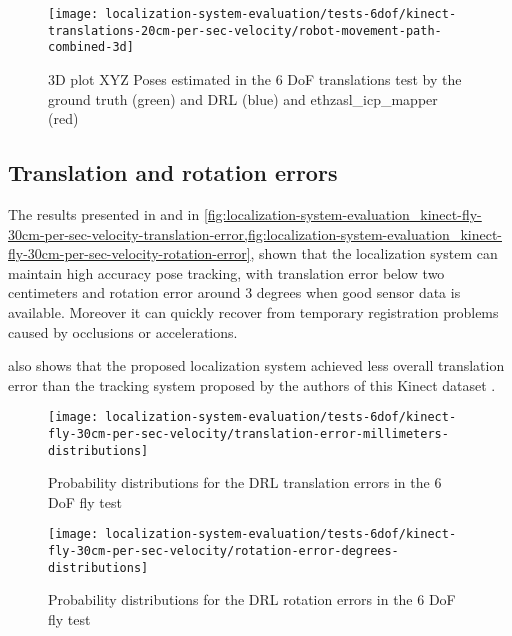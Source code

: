\begin{figure}[H]
	\centering
	\texttt{[image: localization-system-evaluation/tests-6dof/kinect-translations-20cm-per-sec-velocity/robot-movement-path-combined-3d]}
	\caption{3D plot XYZ Poses estimated in the 6 DoF translations test by the ground truth (green) and DRL (blue) and ethzasl\_icp\_mapper (red)}
	\label{fig:localization-system-evaluation_kinect-translations-robot-movement-path-combined-3d}
\end{figure}

\subsection{Translation and rotation errors}

The results presented in  and in \cref{fig:localization-system-evaluation_kinect-fly-30cm-per-sec-velocity-translation-error,fig:localization-system-evaluation_kinect-fly-30cm-per-sec-velocity-rotation-error}, shown that the localization system can maintain high accuracy pose tracking, with translation error below two centimeters and rotation error around 3 degrees when good sensor data is available. Moreover it can quickly recover from temporary registration problems caused by occlusions or accelerations.

 also shows that the proposed localization system achieved less overall translation error than the tracking system proposed by the authors of this Kinect dataset \cite{Pomerleau2011}.


\begin{figure}[H]
	\centering
	\texttt{[image: localization-system-evaluation/tests-6dof/kinect-fly-30cm-per-sec-velocity/translation-error-millimeters-distributions]}
	\caption{Probability distributions for the DRL translation errors in the 6 DoF fly test}
	\label{fig:localization-system-evaluation_kinect-fly-30cm-per-sec-velocity-translation-error}
\end{figure}

\begin{figure}[H]
	\centering
	\texttt{[image: localization-system-evaluation/tests-6dof/kinect-fly-30cm-per-sec-velocity/rotation-error-degrees-distributions]}
	\caption{Probability distributions for the DRL rotation errors in the 6 DoF fly test}
	\label{fig:localization-system-evaluation_kinect-fly-30cm-per-sec-velocity-rotation-error}
\end{figure}

